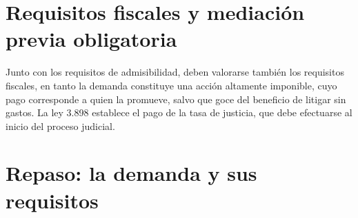\documentclass[12pt,oneside]{book}
\begin{document}
\section{Requisitos fiscales y mediación previa obligatoria}

Junto con los requisitos de admisibilidad, deben valorarse también los requisitos fiscales, en tanto la demanda constituye una acción altamente imponible, cuyo pago corresponde a quien la promueve, salvo que goce del beneficio de litigar sin gastos. La ley 3.898 establece el pago de la tasa de justicia, que debe efectuarse al inicio del proceso judicial.

\section*{Repaso: la demanda y sus requisitos}
\end{document}
